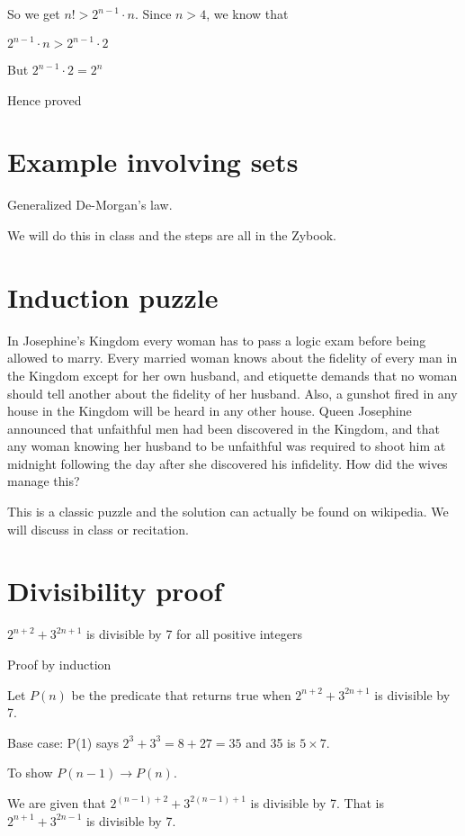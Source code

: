 \documentclass[12pt]{article}
\begin{document}
So we get $n! > 2^{n-1} \cdot n$. Since $n >4$, we know that 

$2^{n-1} \cdot n > 2^{n-1} \cdot 2$ 

But $2^{n-1} \cdot 2 = 2^n$

Hence proved

\section*{Example involving sets}

Generalized De-Morgan's law.

We will do this in class and the steps are all in the Zybook.

\section*{Induction puzzle}

 In Josephine's Kingdom every woman has to pass a logic exam before being allowed to marry. Every married woman knows about the fidelity of every man in the Kingdom except for her own husband, and etiquette demands that no woman should tell another about the fidelity of her husband. Also, a gunshot fired in any house in the Kingdom will be heard in any other house. Queen Josephine announced that unfaithful men had been discovered in the Kingdom, and that any woman knowing her husband to be unfaithful was required to shoot him at midnight following the day after she discovered his infidelity. How did the wives manage this?
 
This is a classic puzzle and the solution can actually be found on wikipedia. We will discuss in class or recitation.

\section*{Divisibility proof}

$2^{n+2} + 3^{2n+1}$ is divisible by 7 for all positive integers

Proof by induction

Let $P(n)$ be the predicate that returns true when $2^{n+2} + 3^{2n+1}$ is divisible by 7.

Base case: P(1) says $2^3 + 3^3 = 8 + 27 = 35$ and 35 is $5 \times 7$.

To show $P(n-1) \rightarrow P(n)$.

We are given that $2^{(n-1) + 2} + 3^{2(n-1)+1}$ is divisible by 7. That is $2^{n+1} + 3^{2n-1}$ is divisible by 7.
\end{document}
